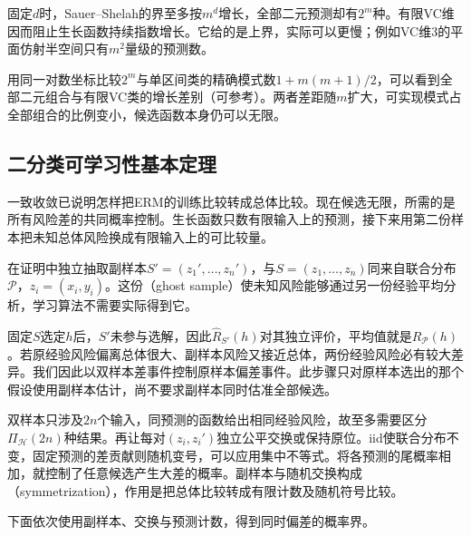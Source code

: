 固定$d$时，Sauer--Shelah的界至多按$m^d$增长，全部二元预测却有$2^m$种。有限VC维因而阻止生长函数持续指数增长。它给的是上界，实际可以更慢；例如VC维3的平面仿射半空间只有$m^2$量级的预测数。

用同一对数坐标比较$2^m$与单区间类的精确模式数$1+m(m+1)/2$，可以看到全部二元组合与有限VC类的增长差别（可参考）。两者差距随$m$扩大，可实现模式占全部组合的比例变小，候选函数本身仍可以无限。

\subsection{二分类可学习性基本定理}
\label{sec:binary-learnability-characterization}

一致收敛已说明怎样把ERM的训练比较转成总体比较。现在候选无限，所需的是所有风险差的共同概率控制。生长函数只数有限输入上的预测，接下来用第二份样本把未知总体风险换成有限输入上的可比较量。

在证明中独立抽取副样本$S'=(z_1',\ldots,z_n')$，与$S=(z_1,\ldots,z_n)$同来自联合分布$\mathcal P$，$z_i=(x_i,y_i)$。这份（ghost sample）使未知风险能够通过另一份经验平均分析，学习算法不需要实际得到它。

固定$S$选定$h$后，$S'$未参与选解，因此$\hat R_{S'}(h)$对其独立评价，平均值就是$R_{\mathcal P}(h)$。若原经验风险偏离总体很大、副样本风险又接近总体，两份经验风险必有较大差异。我们因此以双样本差事件控制原样本偏差事件。此步骤只对原样本选出的那个假设使用副样本估计，尚不要求副样本同时估准全部候选。

双样本只涉及$2n$个输入，同预测的函数给出相同经验风险，故至多需要区分$\Pi_{\mathcal H}(2n)$种结果。再让每对$(z_i,z_i')$独立公平交换或保持原位。iid使联合分布不变，固定预测的差贡献则随机变号，可以应用集中不等式。将各预测的尾概率相加，就控制了任意候选产生大差的概率。副样本与随机交换构成（symmetrization），作用是把总体比较转成有限计数及随机符号比较。

下面依次使用副样本、交换与预测计数，得到同时偏差的概率界。

